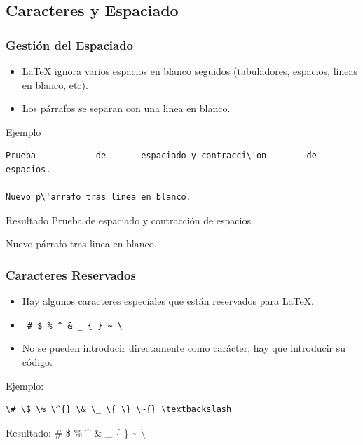 \documentclass[aspectratio=43]{beamer}%
\begin{document}
\subsection{Caracteres y Espaciado}
\begin{frame}[fragile]
\frametitle{\textbf{Gestión del Espaciado}}
\justifying

\begin{itemize}\justifying
  \item \LaTeX{} ignora varios espacios en blanco seguidos (tabuladores, espacios, líneas en blanco, etc).
  \item Los párrafos se separan con una linea en blanco.
\end{itemize}
 \begin{exampleblock}{Ejemplo}
   \lstset{language=}%
   \vspace{-0.7cm}
\begin{lstlisting}
Prueba            de       espaciado y contracci\'on        de     espacios.

Nuevo p\'arrafo tras linea en blanco.
\end{lstlisting}\vspace{-0.3cm}
\end{exampleblock}

\begin{exampleblock}{Resultado}
Prueba            de       espaciado y contracci\'on        de     espacios.

Nuevo p\'arrafo tras linea en blanco.
\end{exampleblock}

\end{frame}

\begin{frame}[fragile]
\frametitle{\textbf{Caracteres Reservados}}
\justifying
 \begin{itemize}\justifying
  \item Hay algunos caracteres especiales que están reservados para \LaTeX{}.
  \item \verb+ # $ % ^ & _ { } ~ \+
  \item No se pueden introducir directamente como carácter, hay que introducir su código.
\end{itemize}

\begin{exampleblock}{Ejemplo:}
   \vspace{-0.7cm}
\begin{lstlisting}
\# \$ \% \^{} \& \_ \{ \} \~{} \textbackslash
\end{lstlisting}\vspace{-0.3cm}

\end{exampleblock}

\begin{exampleblock}{Resultado:}
\# \$ \% \^{} \& \_ \{ \} \~{} \textbackslash
\end{exampleblock}



\end{frame}
\end{document}
